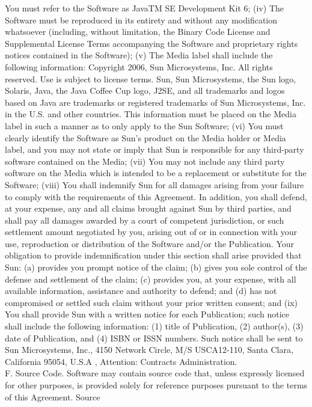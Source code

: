 {You must refer to the Software as JavaTM SE Development Kit 6; (iv)
The Software must be reproduced in its entirety and without any
modification whatsoever (including, without limitation, the Binary
Code License and Supplemental License Terms accompanying the Software
and proprietary rights notices contained in the Software); (v) The
Media label shall include the following information: Copyright 2006,
Sun Microsystems, Inc. All rights reserved. Use is subject to license
terms. Sun, Sun Microsystems, the Sun logo, Solaris, Java, the Java
Coffee Cup logo, J2SE, and all trademarks and logos based on Java are
trademarks or registered trademarks of Sun Microsystems, Inc. in the
U.S. and other countries. This information must be placed on the Media
label in such a manner as to only apply to the Sun Software; (vi) You
must clearly identify the Software as Sun's product on the Media
holder or Media label, and you may not state or imply that Sun is
responsible for any third-party software contained on the Media; (vii)
You may not include any third party software on the Media which is
intended to be a replacement or substitute for the Software; (viii)
You shall indemnify Sun for all damages arising from your failure to
comply with the requirements of this Agreement. In addition, you shall
defend, at your expense, any and all claims brought against Sun by
third parties, and shall pay all damages awarded by a court of
competent jurisdiction, or such settlement amount negotiated by you,
arising out of or in connection with your use, reproduction or
distribution of the Software and/or the Publication. Your obligation
to provide indemnification under this section shall arise provided
that Sun: (a) provides you prompt notice of the claim; (b) gives you
sole control of the defense and settlement of the claim; (c) provides
you, at your expense, with all available information, assistance and
authority to defend; and (d) has not compromised or settled such claim
without your prior written consent; and (ix) You shall provide Sun
with a written notice for each Publication; such notice shall include
the following information: (1) title of Publication, (2) author(s),
(3) date of Publication, and (4) ISBN or ISSN numbers. Such notice
shall be sent to Sun Microsystems, Inc., 4150 Network Circle, M/S
USCA12-110, Santa Clara, California 95054, U.S.A , Attention:
Contracts Administration.
\\[4pt]
F. Source Code. Software may contain source code that, unless
expressly licensed for other purposes, is provided solely for
reference purposes pursuant to the terms of this Agreement. Source
}

